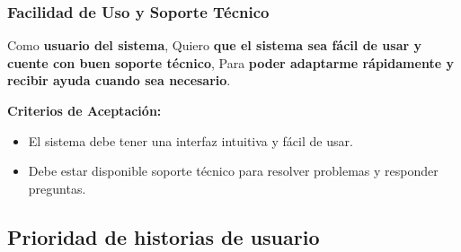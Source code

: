 \documentclass[spanish, 12pt]{article}
\providecommand{\tightlist}{\setlength{\itemsep}{0pt}
\setlength{\parskip}{0pt}}
\begin{document}
	\subsubsection{Facilidad de Uso y Soporte Técnico}
	\label{facilidad-de-uso-y-soporte-tuxe9cnico}

	Como \textbf{usuario del sistema}, Quiero \textbf{que el sistema sea fácil de
	usar y cuente con buen soporte técnico}, Para \textbf{poder adaptarme
	rápidamente y recibir ayuda cuando sea necesario}.

	\textbf{Criterios de Aceptación:}

	\begin{itemize}
		\tightlist

		\item El sistema debe tener una interfaz intuitiva y fácil de usar.

		\item Debe estar disponible soporte técnico para resolver problemas y responder
			preguntas.
	\end{itemize}

	\subsection{Prioridad de historias de usuario}
	\label{prioridad-de-historias-de-usuario}
\end{document}
